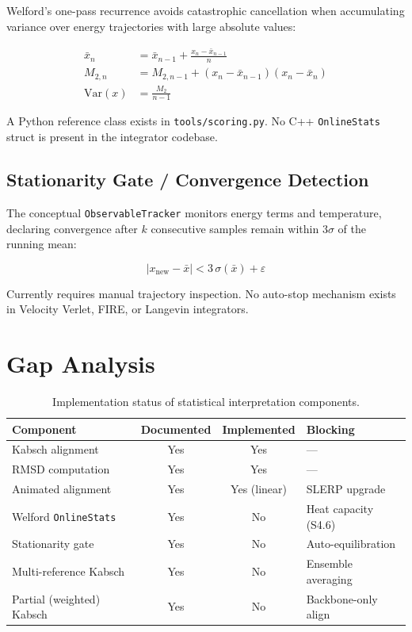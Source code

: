 ﻿\documentclass[11pt]{article}
\begin{document}
Welford's one-pass recurrence avoids catastrophic cancellation when accumulating
variance over energy trajectories with large absolute values:

\begin{align}
\bar{x}_n &= \bar{x}_{n-1} + \frac{x_n - \bar{x}_{n-1}}{n} \\
M_{2,n}   &= M_{2,n-1} + (x_n - \bar{x}_{n-1})(x_n - \bar{x}_n) \\
\text{Var}(x) &= \frac{M_2}{n-1}
\end{align}

A Python reference class exists in \texttt{tools/scoring.py}. No C++
\texttt{OnlineStats} struct is present in the integrator codebase.

\subsection{Stationarity Gate / Convergence Detection}

The conceptual \texttt{ObservableTracker} monitors energy terms and temperature,
declaring convergence after $k$ consecutive samples remain within $3\sigma$ of
the running mean:

\begin{equation}
|x_{\text{new}} - \bar{x}| < 3\,\sigma(\bar{x}) + \varepsilon
\end{equation}

Currently requires manual trajectory inspection. No auto-stop mechanism exists
in Velocity Verlet, FIRE, or Langevin integrators.

\section{Gap Analysis}

\begin{table}[h]
\centering
\begin{tabular}{@{}lccl@{}}
\toprule
\textbf{Component} & \textbf{Documented} & \textbf{Implemented} & \textbf{Blocking} \\
\midrule
Kabsch alignment             & Yes & Yes & --- \\
RMSD computation             & Yes & Yes & --- \\
Animated alignment           & Yes & Yes (linear) & SLERP upgrade \\
Welford \texttt{OnlineStats} & Yes & No  & Heat capacity (S4.6) \\
Stationarity gate            & Yes & No  & Auto-equilibration \\
Multi-reference Kabsch       & Yes & No  & Ensemble averaging \\
Partial (weighted) Kabsch    & Yes & No  & Backbone-only align \\
\bottomrule
\end{tabular}
\caption{Implementation status of statistical interpretation components.}
\end{table}
\end{document}

